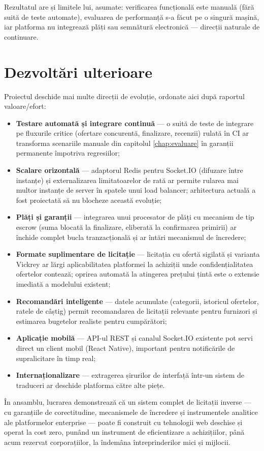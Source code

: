 Rezultatul are și limitele lui, asumate: verificarea funcțională este manuală (fără suită de teste automate), evaluarea de performanță s-a făcut pe o singură mașină, iar platforma nu integrează plăți sau semnătură electronică --- direcții naturale de continuare.

\section{Dezvoltări ulterioare}

Proiectul deschide mai multe direcții de evoluție, ordonate aici după raportul valoare/efort:

\begin{itemize}
    \item \textbf{Testare automată și integrare continuă} --- o suită de teste de integrare pe fluxurile critice (ofertare concurentă, finalizare, recenzii) rulată în CI ar transforma scenariile manuale din capitolul \ref{chap:evaluare} în garanții permanente împotriva regresiilor;
    \item \textbf{Scalare orizontală} --- adaptorul Redis pentru Socket.IO (difuzare între instanțe) și externalizarea limitatoarelor de rată ar permite rularea mai multor instanțe de server în spatele unui load balancer; arhitectura actuală a fost proiectată să nu blocheze această evoluție;
    \item \textbf{Plăți și garanții} --- integrarea unui procesator de plăți cu mecanism de tip escrow (suma blocată la finalizare, eliberată la confirmarea primirii) ar închide complet bucla tranzacțională și ar întări mecanismul de încredere;
    \item \textbf{Formate suplimentare de licitație} --- licitația cu ofertă sigilată și varianta Vickrey \cite{vickrey1961} ar lărgi aplicabilitatea platformei la achiziții unde confidențialitatea ofertelor contează; oprirea automată la atingerea prețului țintă este o extensie imediată a modelului existent;
    \item \textbf{Recomandări inteligente} --- datele acumulate (categorii, istoricul ofertelor, ratele de câștig) permit recomandarea de licitații relevante pentru furnizori și estimarea bugetelor realiste pentru cumpărători;
    \item \textbf{Aplicație mobilă} --- API-ul REST și canalul Socket.IO existente pot servi direct un client mobil (React Native), important pentru notificările de supralicitare în timp real;
    \item \textbf{Internaționalizare} --- extragerea șirurilor de interfață într-un sistem de traduceri ar deschide platforma către alte piețe.
\end{itemize}

În ansamblu, lucrarea demonstrează că un sistem complet de licitații inverse --- cu garanțiile de corectitudine, mecanismele de încredere și instrumentele analitice ale platformelor enterprise --- poate fi construit cu tehnologii web deschise și operat la cost zero, punând un instrument de eficientizare a achizițiilor, până acum rezervat corporațiilor, la îndemâna întreprinderilor mici și mijlocii.
